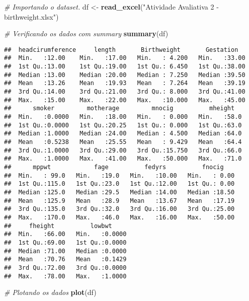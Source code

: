 \documentclass[]{article}
\newenvironment{Shaded}{\begin{snugshade}}{\end{snugshade}}
\newcommand{\CommentTok}[1]{\textcolor[rgb]{0.56,0.35,0.01}{\textit{#1}}}
\newcommand{\KeywordTok}[1]{\textcolor[rgb]{0.13,0.29,0.53}{\textbf{#1}}}
\newcommand{\NormalTok}[1]{#1}
\newcommand{\StringTok}[1]{\textcolor[rgb]{0.31,0.60,0.02}{#1}}
\begin{document}
\begin{Shaded}
\begin{Highlighting}[]
\CommentTok{# Importando o dataset.}
\NormalTok{df <-}\StringTok{ }\KeywordTok{read_excel}\NormalTok{(}\StringTok{"Atividade Avaliativa 2 - birthweight.xlsx"}\NormalTok{)}

\CommentTok{# Verificando os dados com summary}
\KeywordTok{summary}\NormalTok{(df)}
\end{Highlighting}
\end{Shaded}

\begin{verbatim}
##  headcirumference     length       Birthweight       Gestation    
##  Min.   :12.00    Min.   :17.00   Min.   : 4.200   Min.   :33.00  
##  1st Qu.:13.00    1st Qu.:19.00   1st Qu.: 6.450   1st Qu.:38.00  
##  Median :13.00    Median :20.00   Median : 7.250   Median :39.50  
##  Mean   :13.26    Mean   :19.93   Mean   : 7.264   Mean   :39.19  
##  3rd Qu.:14.00    3rd Qu.:21.00   3rd Qu.: 8.000   3rd Qu.:41.00  
##  Max.   :15.00    Max.   :22.00   Max.   :10.000   Max.   :45.00  
##      smoker         motherage         mnocig          mheight    
##  Min.   :0.0000   Min.   :18.00   Min.   : 0.000   Min.   :58.0  
##  1st Qu.:0.0000   1st Qu.:20.25   1st Qu.: 0.000   1st Qu.:63.0  
##  Median :1.0000   Median :24.00   Median : 4.500   Median :64.0  
##  Mean   :0.5238   Mean   :25.55   Mean   : 9.429   Mean   :64.4  
##  3rd Qu.:1.0000   3rd Qu.:29.00   3rd Qu.:15.750   3rd Qu.:66.0  
##  Max.   :1.0000   Max.   :41.00   Max.   :50.000   Max.   :71.0  
##      mppwt            fage          fedyrs          fnocig     
##  Min.   : 99.0   Min.   :19.0   Min.   :10.00   Min.   : 0.00  
##  1st Qu.:115.0   1st Qu.:23.0   1st Qu.:12.00   1st Qu.: 0.00  
##  Median :125.0   Median :29.5   Median :14.00   Median :18.50  
##  Mean   :125.9   Mean   :28.9   Mean   :13.67   Mean   :17.19  
##  3rd Qu.:135.0   3rd Qu.:32.0   3rd Qu.:16.00   3rd Qu.:25.00  
##  Max.   :170.0   Max.   :46.0   Max.   :16.00   Max.   :50.00  
##     fheight          lowbwt      
##  Min.   :66.00   Min.   :0.0000  
##  1st Qu.:69.00   1st Qu.:0.0000  
##  Median :71.00   Median :0.0000  
##  Mean   :70.76   Mean   :0.1429  
##  3rd Qu.:72.00   3rd Qu.:0.0000  
##  Max.   :78.00   Max.   :1.0000
\end{verbatim}

\begin{Shaded}
\begin{Highlighting}[]
\CommentTok{# Plotando os dados}
\KeywordTok{plot}\NormalTok{(df)}
\end{Highlighting}
\end{Shaded}
\end{document}
